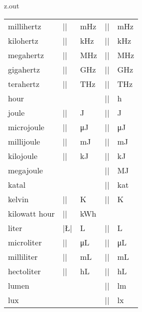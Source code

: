 \begin{VerbatimOut}{z.out}
{\begin{longtable}{@{}lllll@{}}
    \q millihertz&        |\mHz|&  \unit{\mHz}&  |\milli\hertz|&        \unit{\milli\hertz}\\
    \q kilohertz&         |\kHz|&  \unit{\kHz}&  |\kilo\hertz|&         \unit{\kilo\hertz}\\
    \q megahertz&         |\MHz|&  \unit{\MHz}&  |\mega\hertz|&         \unit{\mega\hertz}\\
    \q gigahertz&         |\GHz|&  \unit{\GHz}&  |\giga\hertz|&         \unit{\giga\hertz}\\
    \q terahertz&         |\THz|&  \unit{\THz}&  |\tera\hertz|&         \unit{\tera\hertz}\\[6pt]
    hour&                 &        &             |\hour|&               \unit{\hour}\\[6pt]
    joule&                |\J|&    \unit{\J}&    |\joule|&              \unit{\joule}\\
    \q microjoule&        |\uJ|&   \unit{\uJ}&   |\micro\joule|&        \unit{\micro\joule}\\
    \q millijoule&        |\mJ|&   \unit{\mJ}&   |\milli\joule|&        \unit{\milli\joule}\\
    \q kilojoule&         |\kJ|&   \unit{\kJ}&   |\kilo\joule|&         \unit{\kilo\joule}\\
    \q megajoule&         &        &             |\mega\joule|&         \unit{\mega\joule}\\[6pt]
    katal&                &        &             |\katal|&              \unit{\katal}\\[6pt]
    kelvin&               |\K|&    \unit{\K}&    |\kelvin|&             \unit{\kelvin}\\[6pt]
    kilowatt hour&        |\kWh|&  \unit{\kWh}&  \\[6pt]
    liter&                |\L|&    \unit{\L}&    |\liter|&              \unit{\liter}\\
    \q microliter&        |\uL|&   \unit{\uL}&   |\micro\liter|&        \unit{\micro\liter}\\
    \q milliliter&        |\mL|&   \unit{\mL}&   |\milli\liter|&        \unit{\milli\liter}\\
    \q hectoliter&        |\hL|&   \unit{\hL}&   |\hecto\liter|&        \unit{\hecto\liter}\\[6pt]
    lumen&                &        &             |\lumen|&              \unit{\lumen}\\[6pt]
    lux&                  &        &             |\lux|&                \unit{\lux}\\[6pt]

\end{longtable}}
\end{VerbatimOut}
